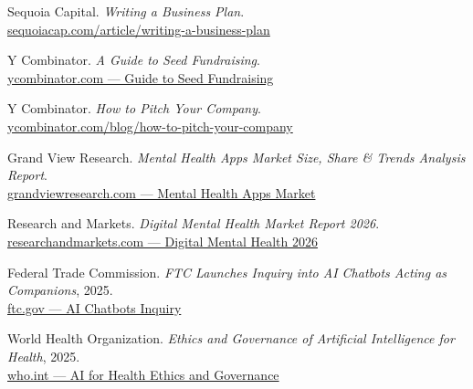 \documentclass[UTF8,11pt,a4paper]{ctexart}
\begin{document}
\begin{enumerate}[leftmargin=2.4em,label={\textcolor{PebbleAccent}{[\arabic*]}}]
  \item Sequoia Capital. \emph{Writing a Business Plan}.\\\href{https://sequoiacap.com/article/writing-a-business-plan/}{sequoiacap.com/article/writing-a-business-plan}
  \item Y Combinator. \emph{A Guide to Seed Fundraising}.\\\href{https://www.ycombinator.com/blog/this-brief-guide-is-a-summary-of-what-startup-founders-need-to-know-about-raising-the-seed-funds-critical-to-getting-their-company-off-the-ground}{ycombinator.com — Guide to Seed Fundraising}
  \item Y Combinator. \emph{How to Pitch Your Company}.\\\href{https://www.ycombinator.com/blog/how-to-pitch-your-company/}{ycombinator.com/blog/how-to-pitch-your-company}
  \item Grand View Research. \emph{Mental Health Apps Market Size, Share \& Trends Analysis Report}.\\\href{https://www.grandviewresearch.com/industry-analysis/mental-health-apps-market-report}{grandviewresearch.com — Mental Health Apps Market}
  \item Research and Markets. \emph{Digital Mental Health Market Report 2026}.\\\href{https://www.researchandmarkets.com/reports/5948541/digital-mental-health-market-report}{researchandmarkets.com — Digital Mental Health 2026}
  \item Federal Trade Commission. \emph{FTC Launches Inquiry into AI Chatbots Acting as Companions}, 2025.\\\href{https://www.ftc.gov/news-events/news/press-releases/2025/09/ftc-launches-inquiry-ai-chatbots-acting-companions}{ftc.gov — AI Chatbots Inquiry}
  \item World Health Organization. \emph{Ethics and Governance of Artificial Intelligence for Health}, 2025.\\\href{https://www.who.int/publications/i/item/9789240084759}{who.int — AI for Health Ethics and Governance}
\end{enumerate}
\end{document}
